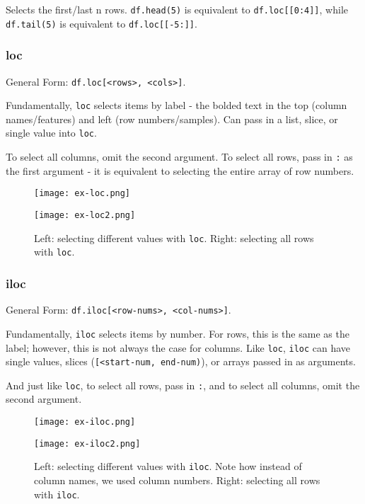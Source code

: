 Selects the first/last n rows. \texttt{df.head(5)} is equivalent to \texttt{df.loc[[0:4]]}, while \texttt{df.tail(5)} is equivalent to \texttt{df.loc[[-5:]]}. 

\subsubsection{loc}
General Form: \texttt{df.loc[<rows>, <cols>]}.

Fundamentally, \texttt{loc} selects items by label - the bolded text in the top (column names/features) and left (row numbers/samples). Can pass in a list, slice, or single value into \texttt{loc}.

To select all columns, omit the second argument. To select all rows, pass in \texttt{:} as the first argument - it is equivalent to selecting the entire array of row numbers.

\begin{figure}[ht]
\begin{minipage}{0.5\textwidth}
\texttt{[image: ex-loc.png]}\centering
\end{minipage}
\begin{minipage}{0.5\textwidth}
\texttt{[image: ex-loc2.png]}\centering
\end{minipage}
\caption{Left: selecting different values with \texttt{loc}. Right: selecting all rows with \texttt{loc}.}
\end{figure}

\subsubsection{iloc}
General Form: \texttt{df.iloc[<row-nums>, <col-nums>]}.

Fundamentally, \texttt{iloc} selects items by number. For rows, this is the same as the label; however, this is not always the case for columns. Like \texttt{loc}, \texttt{iloc} can have single values, slices (\texttt{[<start-num, end-num)}), or arrays passed in as arguments.

And just like \texttt{loc}, to select all rows, pass in \texttt{:}, and to select all columns, omit the second argument.

\begin{figure}[ht]
\begin{minipage}{0.5\textwidth}
\texttt{[image: ex-iloc.png]}\centering
\end{minipage}
\begin{minipage}{0.5\textwidth}
\texttt{[image: ex-iloc2.png]}\centering
\end{minipage}
\caption{Left: selecting different values with \texttt{iloc}. Note how instead of column names, we used column numbers. Right: selecting all rows with \texttt{iloc}.}
\end{figure}

